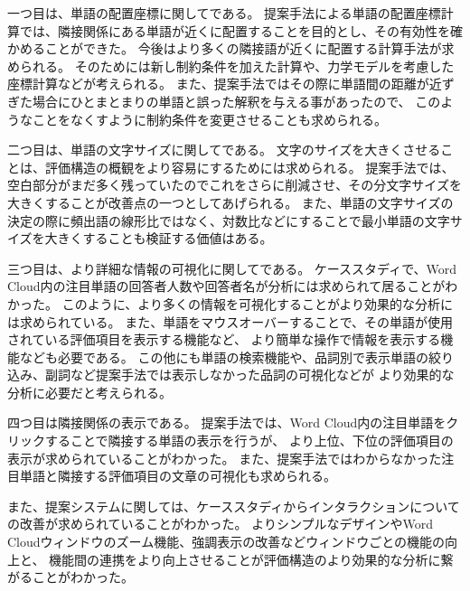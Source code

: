 \documentclass[syuuron]{kuee}
\begin{document}
		一つ目は、単語の配置座標に関してである。
		提案手法による単語の配置座標計算では、隣接関係にある単語が近くに配置することを目的とし、その有効性を確かめることができた。
		今後はより多くの隣接語が近くに配置する計算手法が求められる。
		そのためには新し制約条件を加えた計算や、力学モデルを考慮した座標計算などが考えられる。
		また、提案手法ではその際に単語間の距離が近ずぎた場合にひとまとまりの単語と誤った解釈を与える事があったので、
		このようなことをなくすように制約条件を変更させることも求められる。
		
		二つ目は、単語の文字サイズに関してである。
		文字のサイズを大きくさせることは、評価構造の概観をより容易にするためには求められる。
		提案手法では、空白部分がまだ多く残っていたのでこれをさらに削減させ、その分文字サイズを大きくすることが改善点の一つとしてあげられる。
		また、単語の文字サイズの決定の際に頻出語の線形比ではなく、対数比などにすることで最小単語の文字サイズを大きくすることも検証する価値はある。
		
		三つ目は、より詳細な情報の可視化に関してである。
		ケーススタディで、Word Cloud内の注目単語の回答者人数や回答者名が分析には求められて居ることがわかった。
		このように、より多くの情報を可視化することがより効果的な分析には求められている。
		また、単語をマウスオーバーすることで、その単語が使用されている評価項目を表示する機能など、
		より簡単な操作で情報を表示する機能なども必要である。
		この他にも単語の検索機能や、品詞別で表示単語の絞り込み、副詞など提案手法では表示しなかった品詞の可視化などが
		より効果的な分析に必要だと考えられる。
		
		四つ目は隣接関係の表示である。
		提案手法では、Word Cloud内の注目単語をクリックすることで隣接する単語の表示を行うが、
		より上位、下位の評価項目の表示が求められていることがわかった。
		また、提案手法ではわからなかった注目単語と隣接する評価項目の文章の可視化も求められる。
		
		また、提案システムに関しては、ケーススタディからインタラクションについての改善が求められていることがわかった。
		よりシンプルなデザインやWord Cloudウィンドウのズーム機能、強調表示の改善などウィンドウごとの機能の向上と、
		機能間の連携をより向上させることが評価構造のより効果的な分析に繋がることがわかった。
\end{document}
